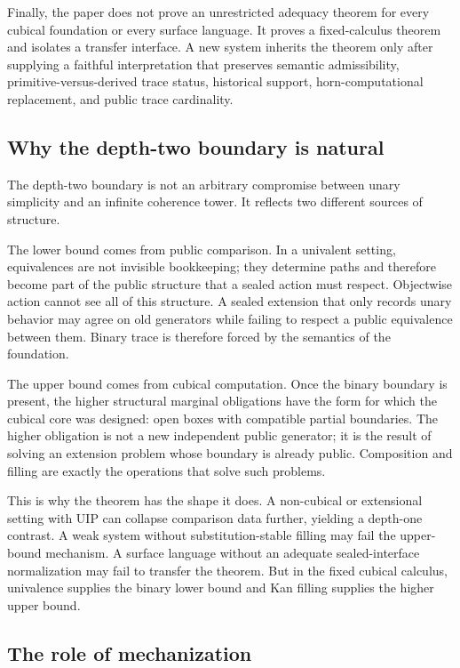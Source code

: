 Finally, the paper does not prove an unrestricted adequacy theorem for every cubical
foundation or every surface language.  It proves a fixed-calculus theorem and isolates a
transfer interface.  A new system inherits the theorem only after supplying a faithful
interpretation that preserves semantic admissibility, primitive-versus-derived trace status,
historical support, horn-computational replacement, and public trace cardinality.

\subsection{Why the depth-two boundary is natural}
\label{subsec:conclusion-why-depth-two}

The depth-two boundary is not an arbitrary compromise between unary simplicity and an
infinite coherence tower.  It reflects two different sources of structure.

The lower bound comes from public comparison.  In a univalent setting, equivalences are not
invisible bookkeeping; they determine paths and therefore become part of the public structure
that a sealed action must respect.  Objectwise action cannot see all of this structure.  A
sealed extension that only records unary behavior may agree on old generators while failing to
respect a public equivalence between them.  Binary trace is therefore forced by the semantics
of the foundation.

The upper bound comes from cubical computation.  Once the binary boundary is present, the
higher structural marginal obligations have the form for which the cubical core was designed:
open boxes with compatible partial boundaries.  The higher obligation is not a new independent
public generator; it is the result of solving an extension problem whose boundary is already
public.  Composition and filling are exactly the operations that solve such problems.

This is why the theorem has the shape it does.  A non-cubical or extensional setting with UIP
can collapse comparison data further, yielding a depth-one contrast.  A weak system without
substitution-stable filling may fail the upper-bound mechanism.  A surface language without an
adequate sealed-interface normalization may fail to transfer the theorem.  But in the fixed
cubical calculus, univalence supplies the binary lower bound and Kan filling supplies the
higher upper bound.

\subsection{The role of mechanization}
\label{subsec:conclusion-mechanization}

